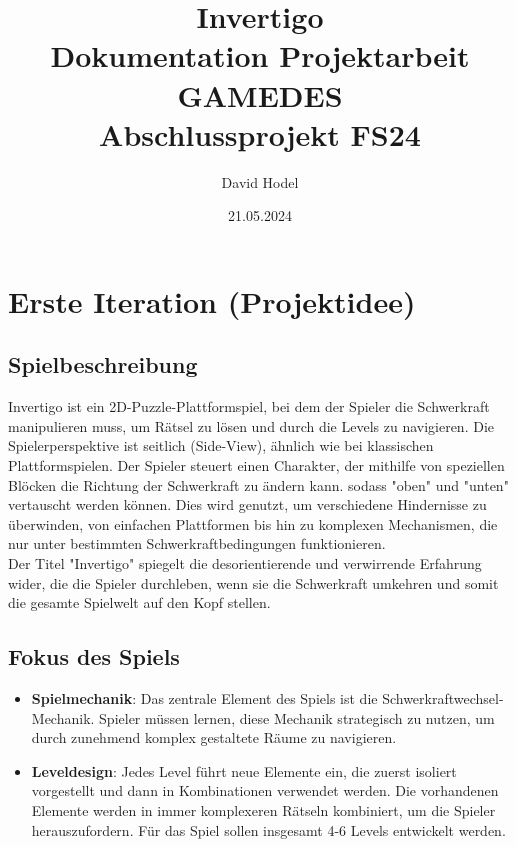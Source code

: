\documentclass{article}
\title{%
Invertigo \\
\large Dokumentation Projektarbeit GAMEDES \\
  Abschlussprojekt FS24}
\author{David Hodel}
\date{21.05.2024}
\begin{document}
\maketitle
\newpage

\tableofcontents
\newpage

\section{Erste Iteration (Projektidee)}

\subsection{Spielbeschreibung}
Invertigo ist ein 2D-Puzzle-Plattformspiel, bei dem der Spieler die Schwerkraft manipulieren muss,
um Rätsel zu lösen und durch die Levels zu navigieren.
Die Spielerperspektive ist seitlich (Side-View), ähnlich wie bei klassischen Plattformspielen.
Der Spieler steuert einen Charakter, der mithilfe von speziellen Blöcken die Richtung der Schwerkraft zu ändern kann.
sodass "oben" und "unten" vertauscht werden können.
Dies wird genutzt, um verschiedene Hindernisse zu überwinden, von einfachen Plattformen bis hin zu komplexen Mechanismen,
die nur unter bestimmten Schwerkraftbedingungen funktionieren.
\\
Der Titel "Invertigo" spiegelt die desorientierende und verwirrende Erfahrung wider, die die Spieler durchleben,
wenn sie die Schwerkraft umkehren und somit die gesamte Spielwelt auf den Kopf stellen.

\subsection{Fokus des Spiels}

\begin{itemize}
    \item \textbf{Spielmechanik}: Das zentrale Element des Spiels ist die Schwerkraftwechsel-Mechanik.
    Spieler müssen lernen, diese Mechanik strategisch zu nutzen, um durch zunehmend komplex gestaltete Räume zu navigieren.
    \item \textbf{Leveldesign}: Jedes Level führt neue Elemente ein, die zuerst isoliert vorgestellt und dann in Kombinationen verwendet werden.
    Die vorhandenen Elemente werden in immer komplexeren Rätseln kombiniert, um die Spieler herauszufordern.
    Für das Spiel sollen insgesamt 4-6 Levels entwickelt werden.
\end{itemize}
\end{document}
